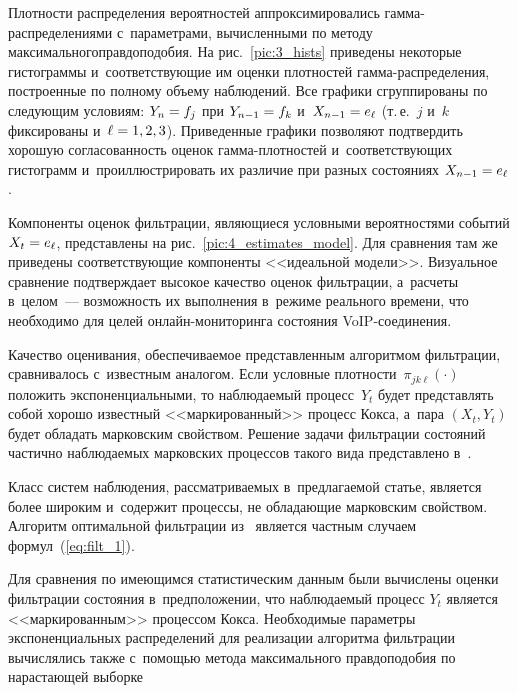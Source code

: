 \begin{multicols}{2}

\pagebreak




Плотности распределения вероятностей аппроксимировались
гам\-ма-рас\-пре\-де\-ле\-ни\-ями с~параметрами, вычисленными по методу
максимального\linebreak правдоподобия. На рис.~\ref{pic:3_hists} приведены
некоторые гис\-то\-грам\-мы и~соответствующие им оценки плотностей
гамма-распределения, построенные по полному объему наблюдений. Все
графики сгруппированы по следующим условиям: $Y_n\hm=f_j$ при
$Y_{n-1}\hm=f_k$ и~$X_{n-1}\hm=e_{\ell}$ (т.\,е.\ $j$ и~$k$ фиксированы 
и~$\ell \hm=1,2,3$). Приведенные графики позволяют подтвердить хорошую
согласованность оценок гам\-ма-плот\-но\-стей и~соответствующих гистограмм
и~проиллюстрировать их различие при разных состояниях
$X_{n-1}\hm=e_{\ell}$.


Компоненты оценок фильтрации, являющи\-еся условными вероятностями
событий $X_t\hm=e_{\ell}$, представлены на
рис.~\ref{pic:4_estimates_model}. Для сравнения там же приведены
соответствующие компоненты <<идеальной модели>>. Визуальное
сравнение подтверждает высокое качество оценок фильтрации, а~расчеты\linebreak
в~целом~--- возможность их выполнения в~режиме реального времени,
что необходимо для целей он\-лайн-мо\-ни\-то\-рин\-га состояния
VoIP-со\-еди\-нения.

\vspace*{12pt}

\columnbreak 

Качество оценивания, обеспечиваемое пред\-став\-лен\-ным алгоритмом
фильтрации, сравнивалось с~известным аналогом. Если условные
плот\-ности~$\pi_{jk\ell}(\cdot)$ положить экспоненциальными, то\linebreak
наблюдаемый процесс~$Y_t$ будет представлять собой хорошо известный
<<маркированный>> процесс Кокса, а~пара $(X_t,Y_t)$ будет обладать
марковским свойством. Решение задачи фильтрации со\-сто\-яний час\-тич\-но
наблюдаемых марковских процессов такого вида представлено 
в~\cite{EAM_94}. 

Класс систем наблюдения, рас\-смат\-ри\-ва\-емых 
в~предлагаемой  \mbox{статье}, является более широким и~содержит процессы, не
обла\-да\-ющие марковским свойством. 
Алгоритм оптимальной фильт\-ра\-ции 
из~\cite{EAM_94} является частным случаем формул~(\ref{eq:filt_1}). 

Для
сравнения по имеющимся статистическим данным были вычислены оценки
фильт\-ра\-ции со\-сто\-яния в~предположении, что наблю\-да\-емый процесс $Y_t$
является <<маркированным>> процессом Кокса. Необходимые параметры
экспоненциальных распределений для реализации алгоритма фильт\-ра\-ции
вычислялись также с~по\-мощью метода максимального правдоподобия
по нарастающей
 выборке\linebreak %

 \end{multicols}
 

